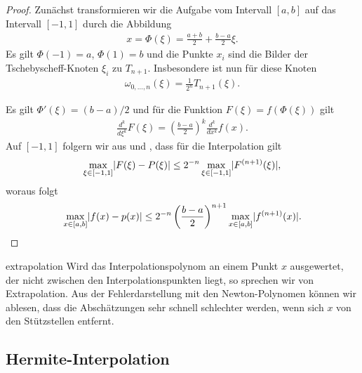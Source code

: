 \begin{proof}
  Zunächst transformieren wir die Aufgabe vom Intervall $[a,b]$ auf
  das Intervall $[-1,1]$ durch die Abbildung
  \begin{gather}
    x = \Phi(\xi) = \frac{a+b}2 + \frac{b-a}2 \xi.
  \end{gather}
  Es gilt $\Phi(-1) = a$, $\Phi(1)=b$ und die Punkte $x_i$ sind die
  Bilder der Tschebyscheff-Knoten $\xi_i$ zu $T_{n+1}$. Insbesondere
  ist nun für diese Knoten
  \begin{gather}
    \omega_{0,\dots,n}(\xi) = \frac1{2^{n}} T_{n+1}(\xi).
  \end{gather}

  Es gilt
  $\Phi'(\xi) = (b-a)/2$ und für die Funktion $F(\xi) = f(\Phi(\xi))$
  gilt
  \begin{gather}
    \frac{d^k}{d\xi^k} F(\xi) = \left(\frac{b-a}2\right)^k
    \frac{d^k}{dx^k} f(x).
  \end{gather}
  Auf $[-1,1]$ folgern wir aus  und
  , dass für die Interpolation gilt
  \begin{gather}
    \max_{\xi\in[-1,1]} \lvert F(\xi) - P(\xi)\rvert
    \le 2^{-n} \max_{\xi\in[-1,1]}\lvert F^{(n+1)}(\xi)\rvert,
  \end{gather}
  woraus folgt
  \begin{gather}
    \max_{x\in[a,b]} \lvert f(x) - p(x)\rvert
    \le 2^{-n} \left(\frac{b-a}2\right)^{n+1} \max_{x\in[a,b]}\lvert f^{(n+1)}(x)\rvert.
  \end{gather}  
\end{proof}

\begin{Bemerkung}{extrapolation}
  Wird das Interpolationspolynom an einem Punkt $x$ ausgewertet, der
  nicht zwischen den Interpolationspunkten liegt, so sprechen wir von
  Extrapolation. Aus der Fehlerdarstellung mit den Newton-Polynomen
  können wir ablesen, dass die Abschätzungen sehr schnell schlechter
  werden, wenn sich $x$ von den Stützstellen entfernt.
\end{Bemerkung}


\subsection{Hermite-Interpolation}

